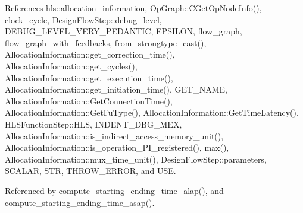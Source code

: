 References hls\+::allocation\+\_\+information, Op\+Graph\+::\+C\+Get\+Op\+Node\+Info(), clock\+\_\+cycle, Design\+Flow\+Step\+::debug\+\_\+level, D\+E\+B\+U\+G\+\_\+\+L\+E\+V\+E\+L\+\_\+\+V\+E\+R\+Y\+\_\+\+P\+E\+D\+A\+N\+T\+IC, E\+P\+S\+I\+L\+ON, flow\+\_\+graph, flow\+\_\+graph\+\_\+with\+\_\+feedbacks, from\+\_\+strongtype\+\_\+cast(), Allocation\+Information\+::get\+\_\+correction\+\_\+time(), Allocation\+Information\+::get\+\_\+cycles(), Allocation\+Information\+::get\+\_\+execution\+\_\+time(), Allocation\+Information\+::get\+\_\+initiation\+\_\+time(), G\+E\+T\+\_\+\+N\+A\+ME, Allocation\+Information\+::\+Get\+Connection\+Time(), Allocation\+Information\+::\+Get\+Fu\+Type(), Allocation\+Information\+::\+Get\+Time\+Latency(), H\+L\+S\+Function\+Step\+::\+H\+LS, I\+N\+D\+E\+N\+T\+\_\+\+D\+B\+G\+\_\+\+M\+EX, Allocation\+Information\+::is\+\_\+indirect\+\_\+access\+\_\+memory\+\_\+unit(), Allocation\+Information\+::is\+\_\+operation\+\_\+\+P\+I\+\_\+registered(), max(), Allocation\+Information\+::mux\+\_\+time\+\_\+unit(), Design\+Flow\+Step\+::parameters, S\+C\+A\+L\+AR, S\+TR, T\+H\+R\+O\+W\+\_\+\+E\+R\+R\+OR, and U\+SE.



Referenced by compute\+\_\+starting\+\_\+ending\+\_\+time\+\_\+alap(), and compute\+\_\+starting\+\_\+ending\+\_\+time\+\_\+asap().

